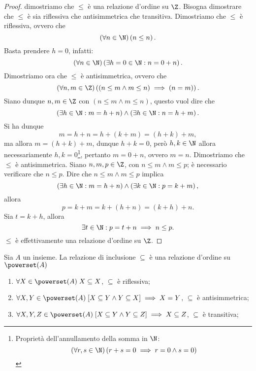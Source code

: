 \begin{proof}
    dimostriamo che \(\leq\) è una relazione d'ordine su \(\Z\). Bisogna dimostrare che \(\leq\) è sia riflessiva che antisimmetrica che transitiva. Dimostriamo che \(\leq\) è riflessiva, ovvero che
    \[
        (\forall n \in \N) \left(n \leq n\right).
    \]
    Basta prendere \(h = 0\), infatti:
    \[
        (\forall n \in \N) \left(\exists h = 0 \in \N : n = 0 + n\right).
    \]
    Dimostriamo ora che \(\leq\) è antisimmetrica, ovvero che
    \[
        (\forall n,m \in \Z) \left((n \leq m \land m \leq n) \implies (n = m)\right).
    \]
    Siano dunque \(n,m \in \Z\) con \((n \leq m \land m \leq n)\), questo vuol dire che
    \[
        \left(\exists h \in \N : m = h + n\right)
        \land
        \left(\exists h \in \N : n = h + m\right).
    \]
    Si ha dunque
    \[
        m = h + n
          = h + (k + m)
          = (h + k) + m,
    \]
    ma allora \(m = (h + k) + m\), dunque \(h + k = 0\), però \(h,k \in \N\) allora necessariamente \(h,k = 0\)\footnote{%
        Proprietà dell'annullamento della somma in \(\N\):
        \[
            (\forall r,s \in \N) \left(r + s = 0 \implies r = 0 \land s = 0\right)
        \] 
    }, pertanto \(m = 0 + n\), ovvero \(m = n\).
    Dimostriamo che \(\leq\) è antisimmetrica. Siano \(n,m,p \in \Z\), con \(n \leq m \land m \leq p\); è necessario verificare che \(n \leq p\). Dire che \(n \leq m \land m \leq p\) implica
    \[
        \left(\exists h \in \N : m = h + n\right)
        \land
        \left(\exists k \in \N : p = k + m\right),
    \]
    allora
    \[
        p = k + m
          = k + (h + n)
          = (k + h) + n.
    \]
    Sia \(t = k + h\), allora
    \[
        \exists t \in \N : p = t + n \implies n \leq p.
    \]
    \(\leq\) è effettivamente una relazione d'ordine su \(\Z\).
\end{proof}

\begin{examples}
    Sia \(A\) un insieme. La relazione di inclusione \(\subseteq\) è una relazione d'ordine su \(\powerset(A)\)
    \begin{enumerate}
        \item \(\forall X     \in \powerset(A)\;  X \subseteq X \), \(\subseteq\) è riflessiva;
        \item \(\forall X,Y   \in \powerset(A)\; [X \subseteq Y \land Y \subseteq X] \implies X = Y \), \(\subseteq\) è antisimmetrica;  
        \item \(\forall X,Y,Z \in \powerset(A)\; [X \subseteq Y \land Y \subseteq Z] \implies X \subseteq Z\), \(\subseteq\) è transitiva;
    \end{enumerate}
\end{examples}



